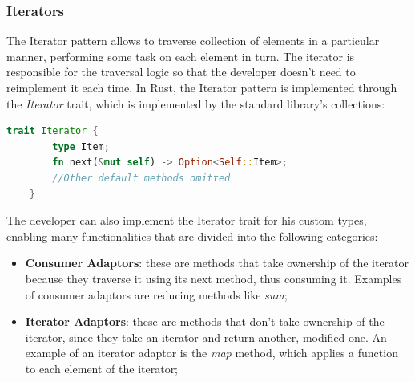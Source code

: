 

\subsubsection{Iterators}
The Iterator pattern allows to traverse collection of elements in a particular manner, performing some task on each element in turn. The iterator is responsible for the traversal logic
so that the developer doesn't need to reimplement it each time. In Rust, the Iterator pattern is implemented through the \textit{Iterator} trait, which is implemented by the standard library's collections:

\begin{lstlisting}[language=Rust]
    trait Iterator {
        type Item;
        fn next(&mut self) -> Option<Self::Item>;
        //Other default methods omitted
    }
\end{lstlisting}

The developer can also implement the Iterator trait for his custom types, enabling many functionalities that are divided into the following categories:

\begin{itemize}
    \item \textbf{Consumer Adaptors}: these are methods that take ownership of the iterator because they traverse it using its next method, thus consuming it. Examples of consumer adaptors are reducing methods like \textit{sum};
    \item \textbf{Iterator Adaptors}: these are methods that don't take ownership of the iterator, since they take an iterator and return another, modified one. An example of an iterator adaptor is the \textit{map} method, which applies a function to each element of the iterator;
\end{itemize}

